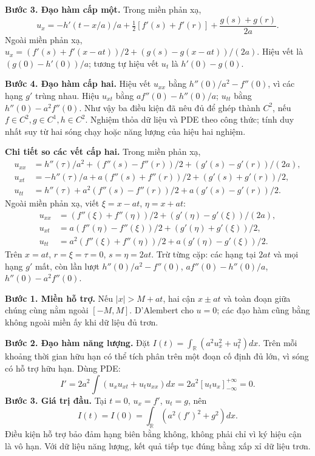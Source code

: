\textbf{Bước 3. Đạo hàm cấp một.} Trong miền phản xạ,
\[u_x=-h'(t-x/a)/a+\tfrac12[f'(s)+f'(r)]+\frac{g(s)+g(r)}{2a}.\]
Ngoài miền phản xạ, $u_x=(f'(s)+f'(x-at))/2+(g(s)-g(x-at))/(2a)$. Hiệu vết là $(g(0)-h'(0))/a$; tương tự hiệu vết $u_t$ là $h'(0)-g(0)$.

\textbf{Bước 4. Đạo hàm cấp hai.} Hiệu vết $u_{xx}$ bằng $h''(0)/a^2-f''(0)$, vì các hạng $g'$ trùng nhau. Hiệu $u_{xt}$ bằng $af''(0)-h''(0)/a$; $u_{tt}$ bằng $h''(0)-a^2f''(0)$. Như vậy ba điều kiện đã nêu đủ để ghép thành $C^2$, nếu $f\in C^2,g\in C^1,h\in C^2$. Nghiệm thỏa dữ liệu và PDE theo công thức; tính duy nhất suy từ hai sóng chạy hoặc năng lượng của hiệu hai nghiệm.

\textbf{Chi tiết so các vết cấp hai.} Trong miền phản xạ,
\[\begin{aligned}
u_{xx}&=h''(\tau)/a^2+(f''(s)-f''(r))/2+(g'(s)-g'(r))/(2a),\\
u_{xt}&=-h''(\tau)/a+a(f''(s)+f''(r))/2+(g'(s)+g'(r))/2,\\
u_{tt}&=h''(\tau)+a^2(f''(s)-f''(r))/2+a(g'(s)-g'(r))/2.
\end{aligned}\]
Ngoài miền phản xạ, viết $\xi=x-at$, $\eta=x+at$:
\[\begin{aligned}
u_{xx}&=(f''(\xi)+f''(\eta))/2+(g'(\eta)-g'(\xi))/(2a),\\
u_{xt}&=a(f''(\eta)-f''(\xi))/2+(g'(\eta)+g'(\xi))/2,\\
u_{tt}&=a^2(f''(\xi)+f''(\eta))/2+a(g'(\eta)-g'(\xi))/2.
\end{aligned}\]
Trên $x=at$, $r=\xi=\tau=0$, $s=\eta=2at$. Trừ từng cặp: các hạng tại $2at$ và mọi hạng $g'$ mất, còn lần lượt $h''(0)/a^2-f''(0)$, $af''(0)-h''(0)/a$, $h''(0)-a^2f''(0)$.

\textbf{Bước 1. Miền hỗ trợ.} Nếu $|x|>M+at$, hai cận $x\pm at$ và toàn đoạn giữa chúng cùng nằm ngoài $[-M,M]$. D'Alembert cho $u=0$; các đạo hàm cũng bằng không ngoài miền ấy khi dữ liệu đủ trơn.

\textbf{Bước 2. Đạo hàm năng lượng.} Đặt $I(t)=\int_{\mathbb R}(a^2u_x^2+u_t^2)dx$. Trên mỗi khoảng thời gian hữu hạn có thể tích phân trên một đoạn cố định đủ lớn, vì sóng có hỗ trợ hữu hạn. Dùng PDE:
\[I'=2a^2\int(u_xu_{xt}+u_tu_{xx})dx=2a^2[u_tu_x]_{-\infty}^{+\infty}=0.\]
\textbf{Bước 3. Giá trị đầu.} Tại $t=0$, $u_x=f'$, $u_t=g$, nên
\[I(t)=I(0)=\int_{\mathbb R}(a^2(f')^2+g^2)dx.\]
Điều kiện hỗ trợ bảo đảm hạng biên bằng không, không phải chỉ vì ký hiệu cận là vô hạn. Với dữ liệu năng lượng, kết quả tiếp tục đúng bằng xấp xỉ dữ liệu trơn.

